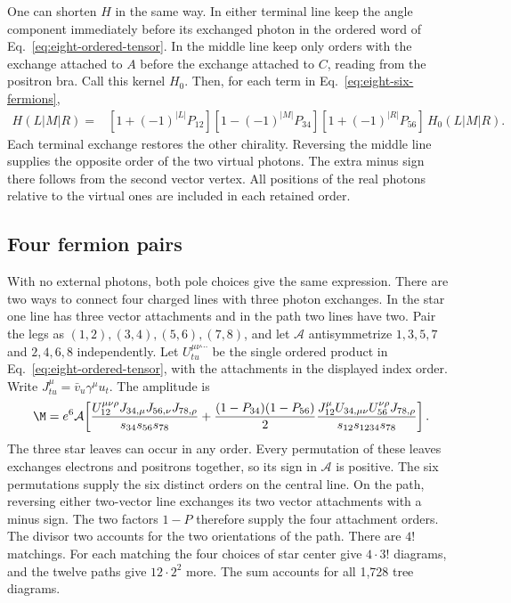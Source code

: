 One can shorten $H$ in the same way. In either terminal line keep the
angle component immediately before its exchanged photon in the ordered
word of Eq.~\eqref{eq:eight-ordered-tensor}. In the middle line keep
only orders with the exchange attached to $A$ before the exchange
attached to $C$, reading from the positron bra. Call this kernel $H_0$.
Then, for each term in Eq.~\eqref{eq:eight-six-fermions},
\begin{align}
 H(L|M|R)={}&[1+(-1)^{|L|}P_{12}]
 [1-(-1)^{|M|}P_{34}]
 [1+(-1)^{|R|}P_{56}]\,H_0(L|M|R).
 \label{eq:eight-six-ends}
\end{align}
Each terminal exchange restores the other chirality. Reversing the
middle line supplies the opposite order of the two virtual photons.
The extra minus sign there follows from the second vector vertex.
All positions of the real photons relative to the virtual ones are
included in each retained order.

\subsection{Four fermion pairs}\label{sec:eight-four-pairs}

With no external photons, both pole choices give the same expression.
There are two ways to connect four charged lines with three photon
exchanges. In the star one line has three vector attachments and in
the path two lines have two. Pair the legs as $(1,2),(3,4),(5,6),(7,8)$,
and let $\mathcal A$ antisymmetrize $1,3,5,7$ and $2,4,6,8$
independently. Let $U^{\mu\nu\cdots}_{tu}$ be the single ordered product in
Eq.~\eqref{eq:eight-ordered-tensor}, with the attachments in the displayed
index order. Write $J_{tu}^{\mu}=\bar v_u\gamma^\mu u_t$. The amplitude is
\begin{align}
 \M=e^6\mathcal A\!\left[
 \frac{U_{12}^{\mu\nu\rho}J_{34,\mu}J_{56,\nu}J_{78,\rho}}
      {s_{34}s_{56}s_{78}}
 +\frac{(1-P_{34})(1-P_{56})}{2}
 \frac{J_{12}^{\mu}U_{34,\mu\nu}U_{56}^{\nu\rho}J_{78,\rho}}
      {s_{12}s_{1234}s_{78}}\right].
 \label{eq:eight-eight-fermions}
\end{align}
The three star leaves can occur in any order. Every permutation of
these leaves exchanges electrons and positrons together, so its sign
in $\mathcal A$ is positive. The six permutations supply the six
distinct orders on the central line. On the path, reversing either
two-vector line exchanges its two vector attachments with a minus
sign. The two factors $1-P$ therefore supply the four attachment
orders. The divisor two accounts for the two orientations of the path.
There are $4!$ matchings. For each matching the four choices of star
center give $4\cdot 3!$ diagrams, and the twelve paths give $12\cdot 2^2$
more. The sum accounts for all 1,728 tree diagrams.

